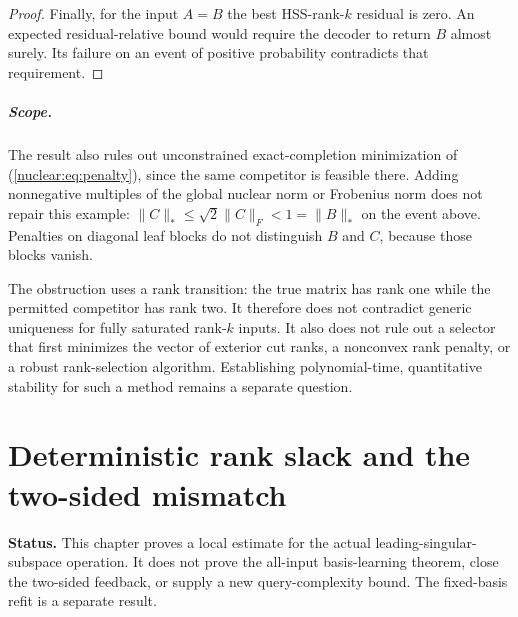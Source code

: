 \documentclass[11pt,oneside,openany,a4paper]{book}
\numberwithin{equation}{chapter}
\theoremstyle{definition}
\theoremstyle{remark}
\newcommand{\F}[1]{\left\lVert#1\right\rVert_F}
\newcommand{\op}[1]{\left\lVert#1\right\rVert_{\rm op}}
\begin{document}
\begin{proof}
Finally, for the input $A=B$ the best HSS-rank-$k$ residual is zero.
An expected residual-relative bound would require the decoder to return
$B$ almost surely. Its failure on an event of positive probability
contradicts that requirement.
\end{proof}

\paragraph{Scope.}
The result also rules out unconstrained exact-completion minimization
of (\ref{nuclear:eq:penalty}), since the same competitor is feasible there.
Adding nonnegative multiples of the global nuclear norm or Frobenius
norm does not repair this example:
$\|C\|_*\le\sqrt2\|C\|_F<1=\|B\|_*$ on the event above.
Penalties on diagonal leaf blocks do not distinguish $B$ and $C$,
because those blocks vanish.

The obstruction uses a rank transition: the true matrix has rank one
while the permitted competitor has rank two. It therefore does not
contradict generic uniqueness for fully saturated rank-$k$ inputs.
It also does not rule out a selector that first minimizes the vector
of exterior cut ranks, a nonconvex rank penalty, or a robust
rank-selection algorithm. Establishing polynomial-time, quantitative
stability for such a method remains a separate question.

\endgroup

\begingroup
\let\F\relax
\newcommand{\F}[1]{\lVert#1\rVert_F}
\let\op\relax
\newcommand{\op}[1]{\lVert#1\rVert_{\mathrm{op}}}
\chapter{Deterministic rank slack and the two-sided mismatch}\label{ch:slack}
\noindent
\textbf{Status.} This chapter proves a local estimate for the actual leading-singular-subspace operation. It does not prove the all-input basis-learning theorem, close the two-sided feedback, or supply a new query-complexity bound. The fixed-basis refit is a separate result.
\end{document}
